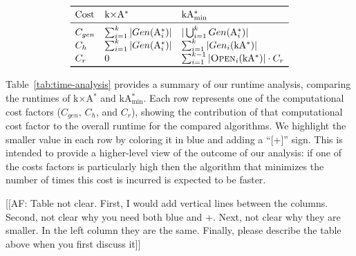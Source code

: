 \documentclass[twoside,11pt]{article}
\newcommand{\kgs}{$k$GP\xspace}
\newcommand{\kastar}{kA$^*$\xspace}
\newcommand{\kastarvar}[1]{\textup{kA}$^*_{#1}$\xspace}
\newcommand{\kastarmin}{\kastarvar{\min}}
\newcommand{\kxastar}{k$\times$A$^*$\xspace}
\newcommand{\astari}[1]{A$^*_{#1}$\xspace}
\newcommand{\newcode}[1]{#1}
\newcommand{\open}{\textsc{Open}\xspace}
\begin{document}
\begin{table}
  \caption{Analysis of the computational costs incurred by \kxastar and \kastarmin.}
  \label{tab:time-analysis}
  \[
  \begin{array}{lll}
    \toprule
    \text{Cost} & \text{\kxastar}                   & \text{\kastarmin} \\
    \midrule
    C_{gen} & \sum_{i=1}^{k} |Gen(\text{\astari{i}})| & \newcode{|\bigcup_{i=1}^{k} Gen(\text{\astari{i}})|}\\
    C_{h}   & \newcode{\sum_{i=1}^{k} |Gen(\text{\astari{i}})|} & \sum_{i=1}^{k} |Gen_i(\text{\kastar})|\\
    C_r     & \newcode{0}                           & \sum_{i=1}^{k-1} |\open_i(\text{\kastar})| \cdot C_r\\
    \bottomrule
  \end{array}
  \]
\end{table}


Table~\ref{tab:time-analysis} provides a summary of our runtime analysis, comparing the runtimes of \kxastar and \kastarmin.
Each row represents one of the computational cost factors ($C_{gen}$, $C_{h}$, and $C_{r}$), showing the contribution of that computational cost factor to the overall runtime for the compared algorithms.
We highlight the smaller value in each row by coloring it in blue and adding a ``[+]'' sign.
This is intended to provide a higher-level view of the outcome of our analysis: if one of the costs factors is particularly high then the algorithm that minimizes the number of times this cost is incurred is expected to be faster. 

[[AF: Table not clear. First, I would add vertical lines between the columns. Second, not clear why you need both blue and +. Next, not clear why they are smaller. In the left column they are the same. Finally, please describe the table above when you first discuss it]]


\end{document}
